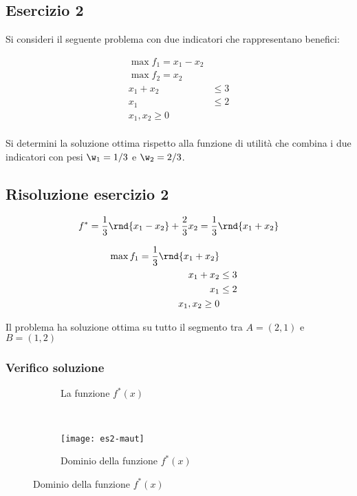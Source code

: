 \documentclass[\main/main.tex]{subfiles}
\begin{document}
\subsection{Esercizio 2}
Si consideri il seguente problema con due indicatori che rappresentano benefici:

\begin{align*}
  \max f_1 = x_1 -x_2 \\
  \max f_2 = x_2      \\
  x_1 + x_2 & \leq 3  \\
  x_1       & \leq 2  \\
  x_1, x_2 \geq 0     \\
\end{align*}

Si determini la soluzione ottima rispetto alla funzione di utilità che combina i
due indicatori con pesi $\w_1 = 1/3$ e $\w_2 = 2/3$.

\subsection{Risoluzione esercizio 2}

\[
  f^* = \frac{1}{3}\rnd{x_1-x_2} + \frac{2}{3}x_2 = \frac{1}{3}\rnd{x_1 + x_2}
\]


\begin{align*}
  \max f_1 = \frac{1}{3}\rnd{x_1 + x_2} \\
  x_1 + x_2 & \leq 3                    \\
  x_1       & \leq 2                    \\
  x_1, x_2 \geq 0                       \\
\end{align*}

Il problema ha soluzione ottima su tutto il segmento tra $A =(2,1)$ e $B = (1,2)$

\subsubsection*{Verifico soluzione}

\begin{figure}
  \begin{subfigure}{0.45\textwidth}
    \caption{La funzione $f^*(x)$}
  \end{subfigure}
  ~
  \begin{subfigure}{0.45\textwidth}
    \texttt{[image: es2-maut]}
    \caption{Dominio della funzione $f^*(x)$}
  \end{subfigure}
\end{figure}
\end{document}
